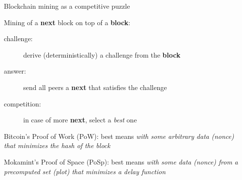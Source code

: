 \documentclass[11pt]{beamer}  %
\begin{document}
\begin{frame}{Blockchain mining as a competitive puzzle}

  Mining of a \textbf{next} block on top of a \textbf{block}:
  \quad{}

  \begin{description}
  \item[{\color{red}challenge:}] derive (deterministically) a challenge from the \textbf{block}
  \item[{\color{red}answer:}] send all peers a \textbf{next} that satisfies the challenge
  \item[{\color{red}competition:}] in case of more \textbf{next}, select a \emph{best} one
  \end{description}

  \bigskip

  Bitcoin's Proof of Work (PoW): best means \emph{with some arbitrary data (nonce) that minimizes the hash of the block}

  \pause
  \bigskip

  Mokamint's Proof of Space (PoSp): best means \emph{with some data (nonce) from a precomputed set (plot) that minimizes a delay function}

\end{frame}
\end{document}
